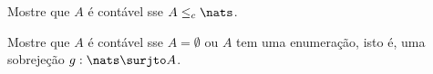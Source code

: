 \begin{exercise}
    Mostre que $A$ é contável sse $A \leq_c \nats$.    
\end{exercise}

\begin{exercise}
    Mostre que $A$ é contável sse $A = \emptyset$ ou $A$ tem uma enumeração, isto é, uma sobrejeção $g : \nats \surjto A$.    
\end{exercise}
